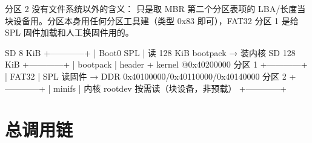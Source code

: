 分区 2 没有文件系统以外的含义： 只是取 MBR 第二个分区表项的 LBA/长度当块设备用。分区本身用任何分区工具建（类型 0x83 即可），FAT32 分区 1 是给 SPL 固件加载和人工换固件用的。

\begin{txtcode}
SD 8 KiB    +------------+
            | Boot0 SPL  |  读 128 KiB bootpack → 装内核
SD 128 KiB  +------------+
            | bootpack   |  header + kernel @0x40200000
分区 1      +------------+
            | FAT32      |  SPL 读固件 → DDR 0x40100000/0x40110000/0x40140000
分区 2      +------------+
            | minifs     |  内核 rootdev 按需读（块设备，非预载）
            +------------+
\end{txtcode}

\section{总调用链}

